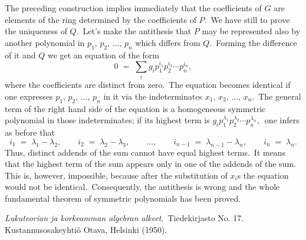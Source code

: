 \documentclass[12pt]{article}
\theoremstyle{definition}
\begin{document}
The preceding construction implies immediately that the coefficients of $G$ are elements of the ring determined by the coefficients of $P$.\, We have still to prove the uniqueness of $Q$.\, Let's make the antithesis that $P$ may be represented also by another polynomial in $p_1,\,p_2,\,\ldots,\,p_n$ which differs from $Q$.\, Forming the difference of it and $Q$ we get an equation of the form
$$0 \;=\; \sum_i g_ip_1^{i_1}p_2^{i_2}\cdots p_n^{i_n},$$
where the coefficients are distinct from zero.\, The equation becomes identical if one expresses 
$p_1,\,p_2,\,\ldots,\,p_n$ in it via the indeterminates $x_1,\,x_2,\,\ldots,\,x_n$.\, The general term of the right hand side of the equation is a homogeneous symmetric polynomial in those indeterminates; if its highest term is 
$g_ip_1^{\lambda_1}p_2^{\lambda_2}\cdots p_n^{\lambda_n},$\, one infers as before that
$$i_1 \;=\; \lambda_1\!-\!\lambda_2, \qquad i_2 \;=\; 
\lambda_2\!-\!\lambda_3, \qquad\ldots, \qquad 
i_{n-1} \;=\; \lambda_{n-1}\!-\!\lambda_n, \qquad i_n \;=\; 
\lambda_n.$$
Thus, distinct addends of the sum cannot have equal highest terms.\, It means that the highest term of the sum appears only in one of the addends of the sum.\, This is, however, impossible, because after the substitution of $x_i$s the equation would not be identical.\, Consequently, the antithesis is wrong and the whole fundamental theorem of symmetric polynomials has been proved.

\begin{thebibliography}{9}
 {\em Lukuteorian ja korkeamman algebran alkeet}. \,Tiedekirjasto No. 17. \, Kustannusosakeyhti\"o Otava, Helsinki (1950).
\end{thebibliography}
\end{document}
